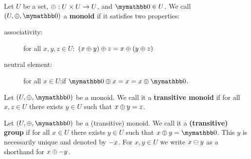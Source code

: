 \begin{definition}
Let $U$ be a set, $\oplus: U \times U \rightarrow U$, and $\neutraladd \in U$.
We call $(U, \groupadd, \neutraladd)$ a \textbf{monoid} if it satisfies two properties:

  \begin{description}
    \item[associativity:] for all $x, y, z \in U:$ $(x \oplus y) \oplus z = x \oplus (y \oplus z)$
    \item[neutral element:] for all $x \in U$:if $\neutraladd \groupadd x = x = x \groupadd \neutraladd$.
  \end{description}
\end{definition}

\begin{definition}
Let $(U, \groupadd, \neutraladd)$ be a monoid.
We call it a \textbf{transitive monoid} if for all $x, z \in U$ there exists $y \in U$ such that $x \oplus y = z$.
\end{definition}

\begin{definition}
Let $(U, \groupadd, \neutraladd)$ be a (transitive) monoid.
We call it a \textbf{(transitive) group} if for all $x \in U$ there exists $y \in U$ such that $x \groupadd y = \neutraladd$.
This $y$ is necessarily unique and denoted by $-{x}$.
For $x, y \in U$ we write $x \ominus y$ as a shorthand for $x \oplus -{y}$.
\end{definition}




